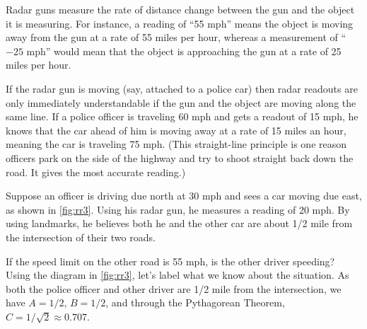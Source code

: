 \begin{example}\label{ex_rr3}%
Radar guns measure the rate of distance change between the gun and the object it is measuring. For instance, a reading of ``55 mph'' means the object is moving away from the gun at a rate of 55 miles per hour, whereas a measurement of ``$-25$ mph'' would mean that the object is approaching the gun at a rate of 25 miles per hour.

If the radar gun is moving (say, attached to a police car) then radar readouts are only immediately understandable if the gun and the object are moving along the same line. If a police officer is traveling 60 mph and gets a readout of 15 mph, he knows that the car ahead of him is moving away at a rate of 15 miles an hour, meaning the car is traveling 75 mph. (This straight-line principle is one reason officers park on the side of the highway and try to shoot straight back down the road. It gives the most accurate reading.)


Suppose an officer is driving due north at 30 mph and sees a car moving due east, as shown in \autoref{fig:rr3}. Using his radar gun, he measures a reading of 20 mph. By using landmarks, he believes both he and the other car are about 1/2 mile from the intersection of their two roads. 

If the speed limit on the other road is 55 mph, is the other driver speeding?
\solution
Using the diagram in \autoref{fig:rr3}, let's label what we know about the situation. As both the police officer and other driver are 1/2 mile from the intersection, we have $A = 1/2$, $B = 1/2$, and through the Pythagorean Theorem, $C = 1/\sqrt{2}\approx 0.707$. 


\end{example}
